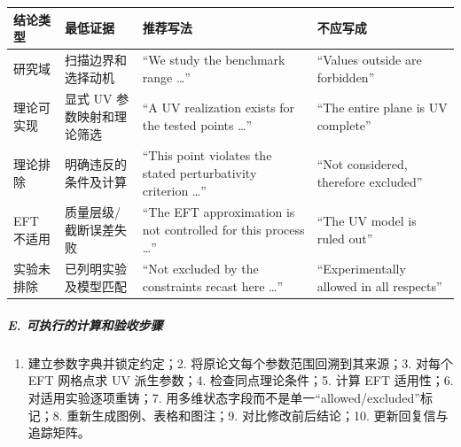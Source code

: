 \documentclass[
  chinese,
  UTF8]{ctexart}
\newcounter{none} %
\providecommand{\tightlist}{%
  \setlength{\itemsep}{0pt}\setlength{\parskip}{0pt}}
\begin{document}
{\def\LTcaptype{none} %
\begin{longtable}[]{@{}
  >{\raggedright\arraybackslash}p{}
  >{\raggedright\arraybackslash}p{}
  >{\raggedright\arraybackslash}p{}
  >{\raggedright\arraybackslash}p{}@{}}
\toprule\noalign{}
\begin{minipage}[b]{\linewidth}\raggedright
结论类型
\end{minipage} & \begin{minipage}[b]{\linewidth}\raggedright
最低证据
\end{minipage} & \begin{minipage}[b]{\linewidth}\raggedright
推荐写法
\end{minipage} & \begin{minipage}[b]{\linewidth}\raggedright
不应写成
\end{minipage} \\
\midrule\noalign{}
\endhead
\bottomrule\noalign{}
\endlastfoot
研究域 & 扫描边界和选择动机 & ``We study the benchmark range \ldots'' &
``Values outside are forbidden'' \\
理论可实现 & 显式 UV 参数映射和理论筛选 & ``A UV realization exists for
the tested points \ldots'' & ``The entire plane is UV complete'' \\
理论排除 & 明确违反的条件及计算 & ``This point violates the stated
perturbativity criterion \ldots'' & ``Not considered, therefore
excluded'' \\
EFT 不适用 & 质量层级/截断误差失败 & ``The EFT approximation is not
controlled for this process \ldots'' & ``The UV model is ruled out'' \\
实验未排除 & 已列明实验及模型匹配 & ``Not excluded by the constraints
recast here \ldots'' & ``Experimentally allowed in all respects'' \\
\end{longtable}
}

\subparagraph{E.
可执行的计算和验收步骤}\label{e.-ux53efux6267ux884cux7684ux8ba1ux7b97ux548cux9a8cux6536ux6b65ux9aa4}

\begin{enumerate}
\def\labelenumi{\arabic{enumi}.}
\tightlist
\item
  建立参数字典并锁定约定；2. 将原论文每个参数范围回溯到其来源；3. 对每个
  EFT 网格点求 UV 派生参数；4. 检查同点理论条件；5. 计算 EFT 适用性；6.
  对适用实验逐项重铸；7.
  用多维状态字段而不是单一``allowed/excluded''标记；8.
  重新生成图例、表格和图注；9. 对比修改前后结论；10.
  更新回复信与追踪矩阵。
\end{enumerate}
\end{document}
